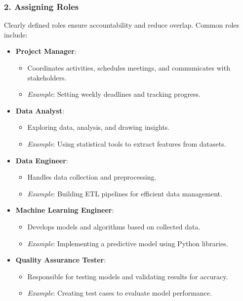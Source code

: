 \documentclass{beamer}
\begin{document}
\begin{frame}[fragile]
    \frametitle{2. Assigning Roles}
    Clearly defined roles ensure accountability and reduce overlap. Common roles include:
    \begin{itemize}
        \item \textbf{Project Manager}:
        \begin{itemize}
            \item Coordinates activities, schedules meetings, and communicates with stakeholders.
            \item \textit{Example}: Setting weekly deadlines and tracking progress.
        \end{itemize}
        
        \item \textbf{Data Analyst}:
        \begin{itemize}
            \item Exploring data, analysis, and drawing insights.
            \item \textit{Example}: Using statistical tools to extract features from datasets.
        \end{itemize}
        
        \item \textbf{Data Engineer}:
        \begin{itemize}
            \item Handles data collection and preprocessing.
            \item \textit{Example}: Building ETL pipelines for efficient data management.
        \end{itemize}
        
        \item \textbf{Machine Learning Engineer}:
        \begin{itemize}
            \item Develops models and algorithms based on collected data.
            \item \textit{Example}: Implementing a predictive model using Python libraries.
        \end{itemize}

        \item \textbf{Quality Assurance Tester}:
        \begin{itemize}
            \item Responsible for testing models and validating results for accuracy.
            \item \textit{Example}: Creating test cases to evaluate model performance.
        \end{itemize}
    \end{itemize}
\end{frame}
\end{document}
